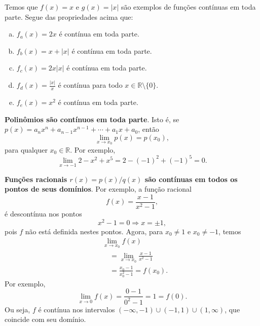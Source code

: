 \begin{ex}
  Temos que $f(x) = x$ e $g(x) = |x|$ são exemplos de funções contínuas em toda parte. Segue das propriedades acima que:
  \begin{enumerate}[a)]
  \item $f_a(x) = 2x$ é contínua em toda parte.
  \item $f_b(x) = x + |x|$ é contínua em toda parte.
  \item $f_c(x) = 2x|x|$ é contínua em toda parte.
  \item $f_d(x) = \frac{|x|}{x}$ é contínua para todo $x\in\mathbb{R}\setminus\{0\}$.
  \item $f_e(x) = x^2$ é contínua em toda parte.
  \end{enumerate}
\end{ex}

\begin{ex}
  {\bf Polinômios são contínuos em toda parte}. Isto é, se $p(x) = a_nx^n+a_{n-1}x^{n-1}+\cdots+a_1x+a_0$, então
  \begin{equation}
    \lim_{x\to x_0} p(x) = p(x_0),
  \end{equation}
  para qualquer $x_0\in\mathbb{R}$. Por exemplo,
  \begin{equation}
    \lim_{x\to -1} 2 - x^2 + x^5 = 2 - (-1)^2 + (-1)^5 = 0.
  \end{equation}
\end{ex}

\begin{ex}
  {\bf Funções racionais $r(x) = p(x)/q(x)$ são contínuas em todos os pontos de seus domínios}. Por exemplo, a função racional
  \begin{equation}
    f(x) = \frac{x-1}{x^2-1},
  \end{equation}
  é descontínua nos pontos
  \begin{equation}
    x^2-1 = 0 \Rightarrow x = \pm 1,
  \end{equation}
  pois $f$ não está definida nestes pontos. Agora, para $x_0\neq 1$ e $x_0\neq -1$, temos
  \begin{align}
    & \lim_{x\to x_0} f(x) \\
    & \text{}\quad = \lim_{x\to x_0} \frac{x-1}{x^2-1} \\
    & \text{}\quad = \frac{x_0-1}{x_0^2-1} = f(x_0).
  \end{align}
  Por exemplo,
  \begin{equation}
    \lim_{x\to 0} f(x) = \frac{0-1}{0^2-1} = 1 = f(0).
  \end{equation}
  Ou seja, $f$ é contínua nos intervalos $(-\infty, -1) \cup (-1, 1) \cup (1, \infty)$, que coincide com seu domínio.
\end{ex}

